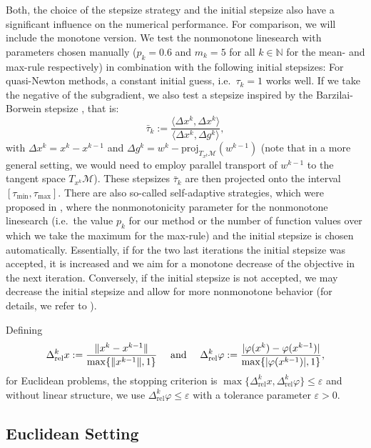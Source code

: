 \documentclass[a4paper, 12pt]{article}
\numberwithin{equation}{section}
\theoremstyle{bolddef}
\theoremstyle{definition}
\theoremstyle{boldplain}
\newcommand{\xk}{x^k}
\newcommand{\wk}{w^k}
\newcommand{\wkm}{w^{k-1}}
\newcommand{\tauk}{\tau_k}
\newcommand{\xkm}{x^{k-1}}
\newcommand{\taumin}{\tau_\mathrm{min}}
\newcommand{\taumax}{\tau_\mathrm{max}}
\newcommand{\N}{\mathbb{N}}
\newcommand{\proj}{\mathrm{proj}}
\begin{document}
Both, the choice of the stepsize strategy and the initial stepsize also have a significant influence on the numerical performance. For comparison, we will include the monotone version. We test the nonmonotone linesearch with parameters chosen manually ($p_k=0.6$ and $m_k=5$ for all $k \in \N$ for the mean- and max-rule respectively) in combination with the following initial stepsizes: For quasi-Newton methods, a constant initial guess, i.e.\ $\tauk = 1$ works well. If we take the negative of the subgradient, we also test a stepsize inspired by the Barzilai-Borwein stepsize \cite{Barzilai1988}, that is:
\begin{equation}\label{eq:bbstepsize}
	{\bar \tau}_k := \frac{\langle \Delta \xk, \Delta \xk\rangle}{\langle \Delta \xk, \Delta g^k\rangle},
\end{equation}
with $\Delta \xk = \xk - \xkm$ and $\Delta g^k = \wk - \proj_{T_{\xk}\mathcal{M}} (\wkm)$ (note that in a more general setting, we would need to employ parallel transport of $\wkm$ to the tangent space $T_{\xk} \mathcal{M}$). These stepsizes ${\bar \tau}_k$ are then projected onto the interval $[\taumin, \taumax]$. There are also so-called self-adaptive strategies, which were proposed in \cite{aragon2025}, where the nonmonotonicity parameter for the nonmonotone linesearch (i.e.\ the value $p_k$ for our method or the number of function values over which we take the maximum for the max-rule) and the initial stepsize is chosen automatically. Essentially, if for the two last iterations the initial stepsize was accepted, it is increased and we aim for a monotone decrease of the objective in the next iteration. Conversely, if the initial stepsize is not accepted, we may decrease the initial stepsize and allow for more nonmonotone behavior (for details, we refer to \cite{aragon2025}).

Defining
\begin{equation*}
	\Delta^k_{\text{rel}} x := \frac{\|\xk - \xkm\|}{\max\{\|\xkm\|, 1\}} \text{ \quad and \quad} \Delta^k_{\text{rel}} \varphi:= \frac{|\varphi(\xk) - \varphi(\xkm)|}{\max\{|\varphi(\xkm)|, 1\}},
\end{equation*}
for Euclidean problems, the stopping criterion is $\max \{ \Delta^k_{\text{rel}} x, \Delta^k_{\text{rel}} \varphi \} \leq \varepsilon$ and without linear structure, we use $\Delta^k_{\text{rel}} \varphi \leq \varepsilon$ with a tolerance parameter $\varepsilon > 0$.

\subsection{Euclidean Setting}
\end{document}
